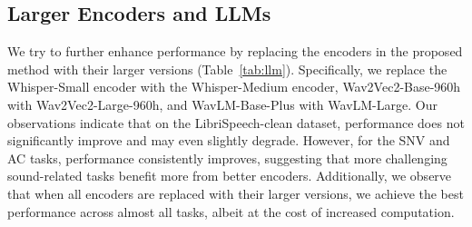 \begin{table*}[t]
\tiny
\centering
{}
\caption{Results with larger encoders and various LLMs. To enhance performance, we replaced the Base version's encoders and experimented with different LLMs.}
\label{tab:llm}
\end{table*}

\subsection{Larger Encoders and LLMs}

We try to further enhance performance by replacing the encoders in the proposed method with their larger versions (Table~\ref{tab:llm}). Specifically, we replace the Whisper-Small encoder with the Whisper-Medium encoder, Wav2Vec2-Base-960h with Wav2Vec2-Large-960h, and WavLM-Base-Plus with WavLM-Large. Our observations indicate that on the LibriSpeech-clean dataset, performance does not significantly improve and may even slightly degrade. However, for the SNV and AC tasks, performance consistently improves, suggesting that more challenging sound-related tasks benefit more from better encoders. Additionally, we observe that when all encoders are replaced with their larger versions, we achieve the best performance across almost all tasks, albeit at the cost of increased computation.

